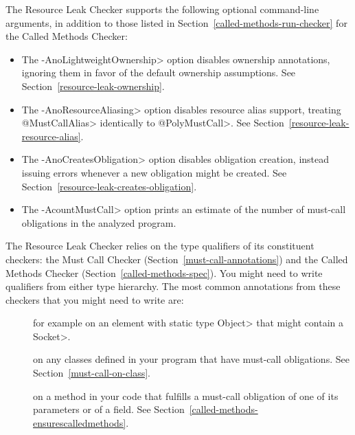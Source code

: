 The Resource Leak Checker supports the following optional command-line arguments,
in addition to those listed in Section~\ref{called-methods-run-checker} for
the Called Methods Checker:
\begin{itemize}
\item The \<-AnoLightweightOwnership> option disables ownership annotations,
  ignoring them in favor of the default ownership assumptions.
  See Section~\ref{resource-leak-ownership}.
\item The \<-AnoResourceAliasing> option disables resource alias support,
  treating \<@MustCallAlias> identically to \<@PolyMustCall>.
  See Section~\ref{resource-leak-resource-alias}.
\item The \<-AnoCreatesObligation> option disables obligation creation,
  instead issuing errors whenever a new obligation might be created.
  See Section~\ref{resource-leak-creates-obligation}.
\item The \<-AcountMustCall> option prints an estimate of the number of
  must-call obligations in the analyzed program.
\end{itemize}



The Resource Leak Checker relies on the type qualifiers of its constituent checkers:
the Must Call Checker (Section~\ref{must-call-annotations}) and
the Called Methods Checker (Section~\ref{called-methods-spec}). You might need
to write qualifiers from either type hierarchy. The most common annotations from
these checkers that you might need to write are:

\begin{description}

\item[]
for example on an element with static type \<Object> that might contain a \<Socket>.

\item[]
on any classes defined in your program that have must-call obligations. See Section~\ref{must-call-on-class}.

\item[] on a method in
your code that fulfills a must-call obligation of one of its parameters or of a field.
See Section~\ref{called-methods-ensurescalledmethods}.

\end{description}

